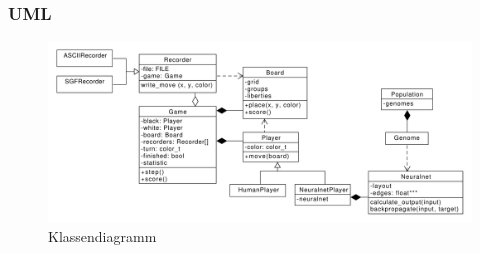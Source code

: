 \begin{frame}
    \frametitle{UML}

    \begin{figure}
        \centering
        \includegraphics[scale=0.4]{content/img/class_diagram.pdf}
        \caption{Klassendiagramm}
    \end{figure}
\end{frame}
